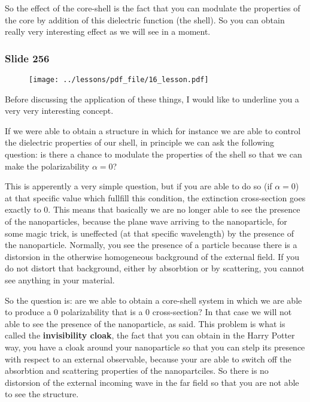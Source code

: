 \documentclass[../main/main.tex]{subfiles}
\begin{document}
So the effect of the core-shell is the fact that you can modulate the properties of the core by addition of this dielectric function (the shell). So you can obtain really very interesting effect as we will see in a moment.

\newpage

\subsubsection{Slide 256}

\begin{figure}[h!]
\centering
\texttt{[image: ../lessons/pdf\_file/16\_lesson.pdf]}
\end{figure}

Before discussing the application of these things, I would like to underline you a very very interesting concept.

If we were able to obtain a structure in which for instance we are able to control the dielectric properties of our shell, in principle we can ask the following question: is there a chance to modulate the properties of the shell so that we can make the polarizability \( \alpha =0 \)?

This is apperently a very simple question, but if you are able to do so (if \( \alpha =0 \)) at that specific value which fullfill this condition, the extinction cross-section goes exactly to 0. This means that basically we are no longer able to see the presence of the nanoparticles, because the plane wave arriving to the nanoparticle, for some magic trick, is uneffected (at that specific wavelength) by the presence of the nanoparticle. Normally, you see the presence of a particle because there is a distorsion in the otherwise homogeneous background of the external field. If you do not distort that background, either by absorbtion or by scattering, you cannot see anything in your material.

So the question is: are we able to obtain a core-shell system in which we are able to produce a 0 polarizability that is a 0 cross-section?
In that case we will not able to see the presence of the nanoparticle, as said. This problem is what is called the \textbf{invisibility cloak}, the fact that you can obtain in the Harry Potter way, you have a cloak around your nanoparticle so that you can stelp its presence with respect to an external observable, because your are able to switch off the absorbtion and scattering properties of the nanopartciles. So there is no distorsion of the external incoming wave in the far field so that you are not able to see the structure.
\end{document}
